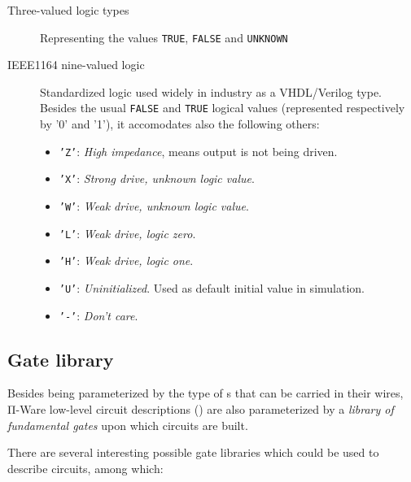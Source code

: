             \begin{description}
                \item[Three-valued logic types]
                    Representing the values \texttt{TRUE}, \texttt{FALSE} and \texttt{UNKNOWN}
                \item[IEEE1164 nine-valued logic]
                    Standardized logic used widely in industry as a VHDL/Verilog type.
                    Besides the usual \texttt{FALSE} and \texttt{TRUE} logical values
                    (represented respectively by '0' and '1'),
                    it accomodates also the following others:
                    \begin{itemize}
                        \item \texttt{'Z'}: \emph{High impedance}, means output is not being driven.
                        \item \texttt{'X'}: \emph{Strong drive, unknown logic value}.
                        \item \texttt{'W'}: \emph{Weak drive, unknown logic value}.
                        \item \texttt{'L'}: \emph{Weak drive, logic zero}.
                        \item \texttt{'H'}: \emph{Weak drive, logic one}.
                        \item \texttt{'U'}: \emph{Uninitialized}. Used as default initial value in simulation.
                        \item \texttt{'-'}: \emph{Don't care}.
                    \end{itemize}
            \end{description}


        \subsection{Gate library}
        \label{subsec:gate-library}
            Besides being parameterized by the type of s that can be carried in their wires,
            Π-Ware low-level circuit descriptions () are also parameterized by
            a \emph{library of fundamental gates} upon which circuits are built.

            There are several interesting possible gate libraries which could be used to describe circuits,
            among which:

